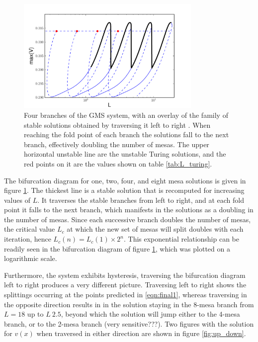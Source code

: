 \documentclass[a4paper,10pt]{article}
\begin{document}
% 
\begin{figure}[htb]
\begin{center}
\includegraphics[width=3.5in]{one_sol_bif}
\caption{Four branches of the GMS system, with an overlay of the family of stable solutions obtained by traversing it left to right . When reaching the fold point of each branch the solutions fall to the next branch, effectively doubling the number of mesas. The upper horizontal unstable line are the unstable Turing solutions, and the red points on it are the values shown on table \ref{tab:L_turing}.}
\label{fig:one_sol}
\end{center}
\end{figure}
% 

The bifurcation diagram for one, two, four, and eight mesa solutions is given in figure \ref{fig:one_sol}. The thickest line is a stable solution that is recomputed for increasing values of $L$. It traverses the stable branches from left to right, and at each fold point it falls to the next branch, which manifests in the solutions as a doubling in the number of mesas. Since each successive branch doubles the number of mesas, the critical value $L_c$ at which the new set of mesas will split doubles with each iteration, hence $L_c(n)=L_c(1)\times 2^n$. This exponential relationship can be readily seen in the bifurcation diagram of figure \ref{fig:one_sol}, which was plotted on a logarithmic scale.

Furthermore, the system exhibits hysteresis, traversing the bifurcation diagram left to right produces a very different picture. Traversing left to right shows the splittings occurring at the points predicted in \eqref{eqn:final1}, whereas traversing in the opposite direction results in in the solution staying in the 8-mesa branch from $L=18$ up to $L~2.5$, beyond which the solution will jump either to the 4-mesa branch, or to the 2-mesa branch (very sensitive???). Two figures with the solution for $v(x)$ when traversed in either direction are shown in figure \ref{fig:up_down}.
\end{document}
